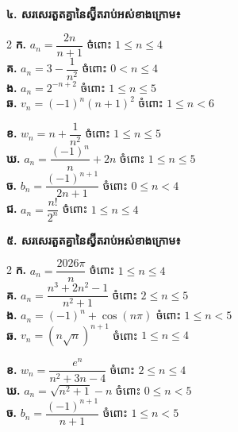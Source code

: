 \documentclass[11pt,a4paper]{article}
\begin{document}
\vspace{2pt}
\textbf{៤. សរសេរតួតគ្នានៃស្វ៊ីតរាប់អស់ខាងក្រោម៖}
\begin{multicols}{2}
\textbf{ក.} $a_n = \dfrac{2n}{n+1}$ ចំពោះ $1 \le n \le 4$\\[7pt]
\textbf{គ.} $a_n = 3 - \dfrac{1}{n^2}$ ចំពោះ $0 < n \le 4$\\[7pt]
\textbf{ង.} $a_n = 2^{-n+2}$ ចំពោះ $1 \le n \le 5$\\[7pt]
\textbf{ឆ.} $v_n = (-1)^n(n+1)^2$ ចំពោះ $1 \le n < 6$

\columnbreak
\textbf{ខ.} $w_n = n + \dfrac{1}{n^2}$ ចំពោះ $1 \le n \le 5$\\[7pt]
\textbf{ឃ.} $a_n = \dfrac{(-1)^n}{n} + 2n$ ចំពោះ $1 \le n \le 5$\\[7pt]
\textbf{ច.} $b_n = \dfrac{(-1)^{n+1}}{2n+1}$ ចំពោះ $0 \le n < 4$\\[7pt]
\textbf{ជ.} $a_n = \dfrac{n!}{2^n}$ ចំពោះ $1 \le n \le 4$
\end{multicols}

\newpage

\textbf{៥. សរសេរតួតគ្នានៃស្វ៊ីតរាប់អស់ខាងក្រោម៖}
\begin{multicols}{2}
\textbf{ក.} $a_n = \dfrac{2026\pi}{n}$ ចំពោះ $1 \le n \le 4$\\[8pt]
\textbf{គ.} $a_n = \dfrac{n^3+2n^2-1}{n^2+1}$ ចំពោះ $2 \le n \le 5$\\[8pt]
\textbf{ង.} $a_n = (-1)^n + \cos(n\pi)$ ចំពោះ $1 \le n < 5$\\[8pt]
\textbf{ឆ.} $v_n = (n\sqrt{n})^{n+1}$ ចំពោះ $1 \le n \le 4$

\columnbreak
\textbf{ខ.} $w_n = \dfrac{e^n}{n^2+3n-4}$ ចំពោះ $2 \le n \le 4$\\[8pt]
\textbf{ឃ.} $a_n = \sqrt{n^2+1}-n$ ចំពោះ $0 \le n < 5$\\[8pt]
\textbf{ច.} $b_n = \dfrac{(-1)^{n+1}}{n+1}$ ចំពោះ $1 \le n < 5$
\end{multicols}
\end{document}
